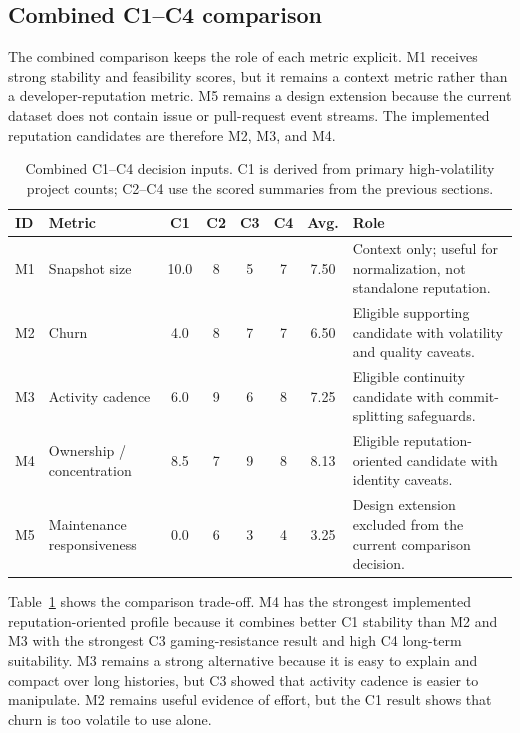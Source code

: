 \subsection{Combined C1--C4 comparison}
\label{sec:combined_c1_c4_comparison}

The combined comparison keeps the role of each metric explicit. M1 receives strong stability and feasibility
scores, but it remains a context metric rather than a developer-reputation metric. M5 remains a design extension
because the current dataset does not contain issue or pull-request event streams. The implemented reputation
candidates are therefore M2, M3, and M4.

\begin{table}[H]
\centering
\scriptsize
\renewcommand{\arraystretch}{1.08}
\begin{tabularx}{\textwidth}{p{0.8cm}p{3.1cm}cccccX}
\toprule
\textbf{ID} & \textbf{Metric} & \textbf{C1} & \textbf{C2} & \textbf{C3} & \textbf{C4} & \textbf{Avg.} & \textbf{Role} \\
\midrule
M1 & Snapshot size & 10.0 & 8 & 5 & 7 & 7.50 & Context only; useful for normalization, not standalone reputation. \\
M2 & Churn & 4.0 & 8 & 7 & 7 & 6.50 & Eligible supporting candidate with volatility and quality caveats. \\
M3 & Activity cadence & 6.0 & 9 & 6 & 8 & 7.25 & Eligible continuity candidate with commit-splitting safeguards. \\
M4 & Ownership / concentration & 8.5 & 7 & 9 & 8 & 8.13 & Eligible reputation-oriented candidate with identity caveats. \\
M5 & Maintenance responsiveness & 0.0 & 6 & 3 & 4 & 3.25 & Design extension excluded from the current comparison decision. \\
\bottomrule
\end{tabularx}
\caption{Combined C1--C4 decision inputs. C1 is derived from primary high-volatility project counts; C2--C4 use the scored summaries from the previous sections.}
\label{tab:phase2_combined_comparison}
\end{table}

Table~\ref{tab:phase2_combined_comparison} shows the comparison trade-off. M4 has the strongest implemented reputation-oriented profile because
it combines better C1 stability than M2 and M3 with the strongest C3 gaming-resistance result and high C4
long-term suitability. M3 remains a strong alternative because it is easy to explain and compact over long histories,
but C3 showed that activity cadence is easier to manipulate. M2 remains useful evidence of effort, but the C1 result
shows that churn is too volatile to use alone.

